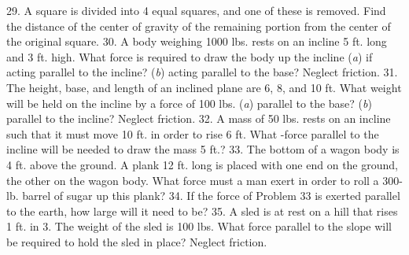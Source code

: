29. A square is divided into 4 equal squares, and one of these is removed. Find the distance of the center of gravity of the remaining portion from the center of the original square.
30. A body weighing 1000 lbs. rests on an incline 5 ft. long and 3 ft. high. What force is required to draw the body up the incline (\emph{a}) if acting parallel to the incline? (\emph{b}) acting parallel to the base? Neglect friction.
31. The height, base, and length of an inclined plane are 6, 8, and 10 ft. What weight will be held on the incline by a force of 100 lbs. (\emph{a}) parallel to the base? (\emph{b}) parallel to the incline? Neglect friction.
32. A mass of 50 lbs. rests on an incline such that it must move 10 ft. in order to rise 6 ft. What -force parallel to the incline will be needed to draw the mass 5 ft.?
33. The bottom of a wagon body is 4 ft. above the ground. A plank 12 ft. long is placed with one end on the ground, the other on the wagon body. What force must a man exert in order to roll a 300-lb. barrel of sugar up this plank? 34. If the force of Problem 33 is exerted parallel to the earth, how large will it need to be?
35. A sled is at rest on a hill that rises 1 ft. in 3. The weight of the sled is 100 lbs. What force parallel to the slope will be required to hold the sled in place? Neglect friction.